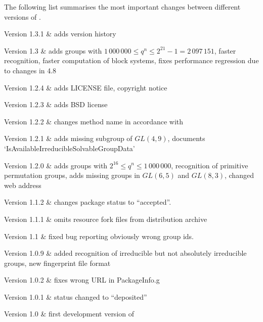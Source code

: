 
The following list summarises the most important changes between different versions of \IRREDSOL.

\beginitems
Version 1.3.1 &
	adds version history
	
Version 1.3 &
	adds groups with $1\,000\,000 \leq q^n \leq 2^{21} - 1 = 2\,097\,151$, faster recognition, faster computation of block systems, fixes performance regression due to changes in {\GAP} 4.8
	
Version 1.2.4 &
	adds LICENSE file, copyright notice
	
Version 1.2.3 & 
	adds BSD license
	
Version 1.2.2 &
	changes method name in accordance with {\GAP}
	
Version 1.2.1 &
	adds missing subgroup of $GL(4,9)$, documents `IsAvailableIrreducibleSolvableGroupData'
	
Version 1.2.0 &
	adds groups with $2^{16} \leq q^n \leq 1\,000\,000$, recognition of primitive permutation groups, adds missing groups in $GL(6,5)$ and $GL(8,3)$, changed web address

Version 1.1.2 &
	changes package status to ``accepted''.
	
Version 1.1.1 & 
	omits resource fork files from distribution archive
	
Version 1.1 &
	fixed bug reporting obviously wrong group ids.
	
Version 1.0.9 & 
	added recognition of irreducible but not absolutely irreducible groups, new fingerprint file format
	
Version 1.0.2 & 
	fixes wrong URL in PackageInfo.g
	
Version 1.0.1 &
	status changed to ``deposited''
	
Version 1.0 &
 	first development version of {\IRREDSOL}
	
\enditems


